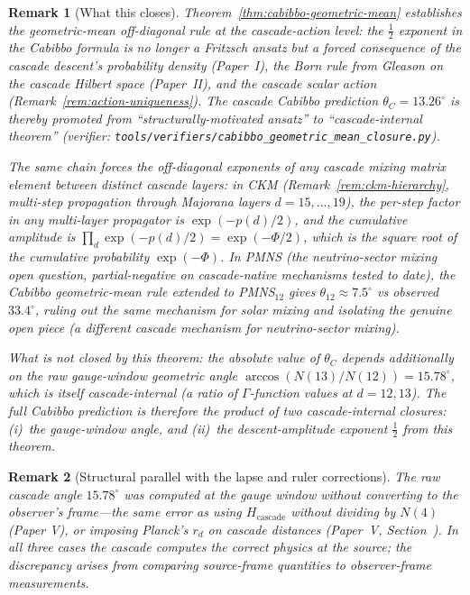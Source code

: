 \documentclass[12pt,a4paper]{article}
\newtheorem*{remark}{Remark}
\begin{document}
\begin{remark}[What this closes]\label{rem:cabibbo-geomean-closes}
Theorem~\ref{thm:cabibbo-geometric-mean} establishes the
geometric-mean off-diagonal rule at the cascade-action level: the
$\tfrac{1}{2}$ exponent in the Cabibbo formula is no longer a Fritzsch
ansatz but a forced consequence of the cascade descent's probability
density (Paper~I), the Born rule from Gleason on the cascade Hilbert
space (Paper~II), and the cascade scalar action
(Remark~\ref{rem:action-uniqueness}).  The cascade Cabibbo prediction
$\theta_C = 13.26^\circ$ is thereby promoted from
``structurally-motivated ansatz'' to ``cascade-internal theorem''
(verifier:
\texttt{tools/verifiers/cabibbo\_geometric\_mean\_closure.py}).

The same chain forces the off-diagonal exponents of any cascade mixing
matrix element between distinct cascade layers: in CKM
(Remark~\ref{rem:ckm-hierarchy}, multi-step propagation through
Majorana layers $d=15,\ldots,19$), the per-step factor in any
multi-layer propagator is $\exp(-p(d)/2)$, and the cumulative amplitude
is $\prod_d \exp(-p(d)/2)=\exp(-\Phi/2)$, which is the square root of
the cumulative probability $\exp(-\Phi)$.  In PMNS (the
neutrino-sector mixing open question, partial-negative on cascade-native
mechanisms tested to date), the Cabibbo geometric-mean rule extended to
PMNS$_{12}$ gives $\theta_{12}\approx 7.5^\circ$ vs observed $33.4^\circ$,
ruling out the same mechanism for solar mixing and isolating the genuine
open piece (a different cascade mechanism for neutrino-sector mixing).

What is \emph{not} closed by this theorem: the absolute value of
$\theta_C$ depends additionally on the raw gauge-window geometric angle
$\arccos(N(13)/N(12))=15.78^\circ$, which is itself cascade-internal
(a ratio of $\Gamma$-function values at $d=12,13$).  The full Cabibbo
prediction is therefore the product of two cascade-internal closures:
(i)~the gauge-window angle, and (ii)~the descent-amplitude exponent
$\tfrac{1}{2}$ from this theorem.
\end{remark}

\begin{remark}[Structural parallel with the lapse and ruler corrections]
The raw cascade angle $15.78^\circ$ was computed at the gauge window without converting to the observer's frame---the same error as using $H_{\text{cascade}}$ without dividing by $N(4)$ (Paper V), or imposing Planck's $r_d$ on cascade distances (Paper~V, Section~). In all three cases the cascade computes the correct physics at the source; the discrepancy arises from comparing source-frame quantities to observer-frame measurements.
\end{remark}
\end{document}
